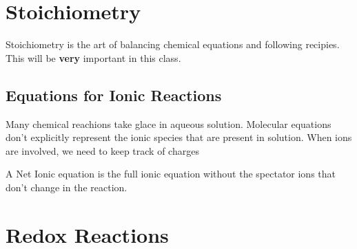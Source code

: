 \documentclass[11pt, letterpaper]{article}
\begin{document}
\section*{Stoichiometry}
Stoichiometry is the art of balancing chemical equations and following recipies.
This will be \textbf{very} important in this class.


\subsection*{Equations for Ionic Reactions}
Many chemical reachions take glace in aqueous solution.
Molecular equations don't explicitly represent the ionic species that are present in solution.
When ions are involved, we need to keep track of charges

A Net Ionic equation is the full ionic equation without the spectator ions that don't change 
in the reaction. 











\section*{Redox Reactions}
\end{document}

